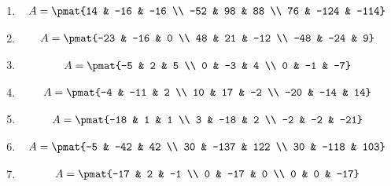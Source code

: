 \begin{enumerate}
\item

\begin{align*}
A = \pmat{14 & -16 & -16 \\ -52 & 98 & 88 \\ 76 & -124 & -114}
\end{align*}

\item

\begin{align*}
A = \pmat{-23 & -16 & 0 \\ 48 & 21 & -12 \\ -48 & -24 & 9}
\end{align*}

\item

\begin{align*}
A = \pmat{-5 & 2 & 5 \\ 0 & -3 & 4 \\ 0 & -1 & -7}
\end{align*}

\item

\begin{align*}
A = \pmat{-4 & -11 & 2 \\ 10 & 17 & -2 \\ -20 & -14 & 14}
\end{align*}

\item

\begin{align*}
A = \pmat{-18 & 1 & 1 \\ 3 & -18 & 2 \\ -2 & -2 & -21}
\end{align*}

\item

\begin{align*}
A = \pmat{-5 & -42 & 42 \\ 30 & -137 & 122 \\ 30 & -118 & 103}
\end{align*}

\item

\begin{align*}
A = \pmat{-17 & 2 & -1 \\ 0 & -17 & 0 \\ 0 & 0 & -17}
\end{align*}


\end{enumerate}
